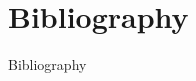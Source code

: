 \section{Bibliography}
\begin{frame}[allowframebreaks]{Bibliography}
    \printbibliography[heading=none]
\end{frame}